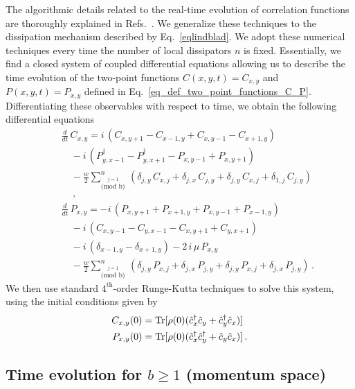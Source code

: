 The algorithmic details related to the real-time evolution of correlation functions are thoroughly explained in Refs.~\cite{NRV-2019-competingdissipativeandcoherent, TV-2021-dissipativeboundaries}. We generalize these techniques to the dissipation mechanism described by Eq.~\eqref{eqlindblad}. We adopt these numerical techniques every time the number of local dissipators $n$ is fixed. Essentially, we find a closed system of coupled differential equations allowing us to describe the time evolution of the two-point functions $C(x, y, t)=C_{x,y}$ and $P(x, y, t)=P_{x,y}$ defined in Eq.~\eqref{eq_def_two_point_functions_C_P}. Differentiating these observables with respect to time, we obtain the following differential equations
\begin{eqnarray}
&&  \frac{d}{dt}\,{C}_{x,y} = i\,({C}_{x,y+1} -
  {C}_{x-1,y} + {C}_{x,y-1} - {C}_{x+1,y})
  \qquad \label{eqscxy}\\
&&\quad -i \, ({P}_{y,x-1}^\dagger
  - {P}_{y,x+1}^\dagger - {P}_{x,y-1} + {P}_{x,y+1})
  \nonumber \\
  & &  \quad
  - \frac{w}{2} \sum_{\overset{j=1}{\text{(mod b)}}}^n \,( \delta_{j,y}\,
  {C}_{x,j} + \delta_{j,x}\, {C}_{j,y} 
+\delta_{j,y}\, {C}_{x,j} + \delta _{1,j}\,
  {C}_{j,y}) \nonumber\\
&&\quad  \,,\nonumber\\
&&\frac{d}{dt}\,{P}_{x,y} = -i\,({P}_{x,y+1} +
    {P}_{x+1,y}+ {P}_{x,y-1} + {P}_{x-1,y})
    \nonumber\\
 && \quad -
i\,( {C}_{x,y-1} -
{C}_{y,x-1} - {C}_{x,y+1} 
+ {C}_{y,x+1}) \nonumber \\
 && \quad -
i\,(\delta_{x-1,y} - \delta_{x+1,y})
- 2\,i\,\mu \,{P}_{x,y} \nonumber \\
&&\quad - \frac{w}{2} \sum_{\overset{j=1}{\text{(mod b)}}}^n\,(\delta_{j,y}\,{P}_{x,j} +
\delta_{j,x}\,{P}_{j,y}+ \delta _{j,y}\,{P}_{x,j}
+ \delta_{j,x}\,{P}_{j,y}) \,.  
\nonumber
\end{eqnarray}
We then use standard $4^{\text{th}}$-order Runge-Kutta techniques to solve this system, using the initial conditions given by
\begin{align}
    C_{x,y}(0)&={\rm Tr}[\rho(0)(\hat{c}^\dagger_x\hat{c}_y+\hat{c}^\dagger_y\hat{c}_x)]\\
    P_{x,y}(0)&={\rm Tr}[\rho(0)(\hat{c}^\dagger_x\hat{c}^\dagger_y+\hat{c}_y\hat{c}_x)]\,.
    \label{eq_operators_CP_in_appendix}
\end{align}

\subsection{Time evolution for $b\geq1$ (momentum space)}
\label{sec_app_momentum_space}

